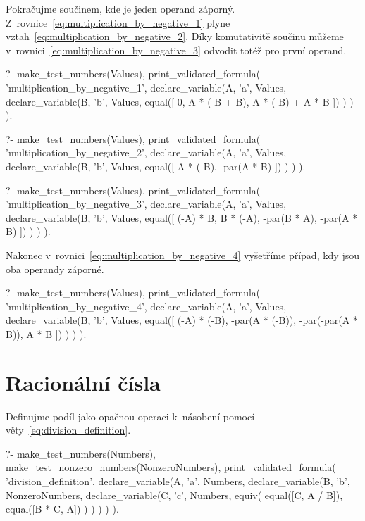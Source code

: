 Pokračujme součinem, kde je jeden operand záporný. Z~rovnice~\eqref{eq:multiplication_by_negative_1} plyne vztah~\eqref{eq:multiplication_by_negative_2}. Díky komutativitě součinu můžeme v~rovnici~\eqref{eq:multiplication_by_negative_3} odvodit totéž pro první operand. 

\begin{prolog}
?-	make_test_numbers(Values),
	print_validated_formula(
		'multiplication_by_negative_1',
		declare_variable(A, 'a', Values,
			declare_variable(B, 'b', Values,
				equal([
					0,
					A * (-B + B),
					A * (-B) + A * B
				])
			)
		)
	).
\end{prolog}
\begin{prolog}
?-	make_test_numbers(Values),
	print_validated_formula(
		'multiplication_by_negative_2',
		declare_variable(A, 'a', Values,
			declare_variable(B, 'b', Values,
				equal([
					A * (-B), -par(A * B)
				])
			)
		)
	).
\end{prolog}
\begin{prolog}
?-	make_test_numbers(Values),
	print_validated_formula(
		'multiplication_by_negative_3',
		declare_variable(A, 'a', Values,
			declare_variable(B, 'b', Values,
				equal([
					(-A) * B,
					B * (-A),
					-par(B * A),
					-par(A * B)
				])
			)
		)
	).
\end{prolog}

Nakonec v~rovnici~\eqref{eq:multiplication_by_negative_4} vyšetříme případ, kdy jsou oba operandy záporné.

\begin{prolog}
?-	make_test_numbers(Values),
	print_validated_formula(
		'multiplication_by_negative_4',
		declare_variable(A, 'a', Values,
			declare_variable(B, 'b', Values,
				equal([
					(-A) * (-B),
					-par(A * (-B)),
					-par(-par(A * B)),
					A * B
				])
			)
		)
	).
\end{prolog}

\section{Racionální čísla}

Definujme podíl jako opačnou operaci k~násobení pomocí věty~\eqref{eq:division_definition}.

\begin{prolog}
?-	make_test_numbers(Numbers),
	make_test_nonzero_numbers(NonzeroNumbers),
	print_validated_formula(
		'division_definition',
		declare_variable(A, 'a', Numbers,
			declare_variable(B, 'b', NonzeroNumbers,
				declare_variable(C, 'c', Numbers,
					equiv(
						equal([C, A / B]),
						equal([B * C, A])
					)
				)
			)
		)
	).
\end{prolog}

